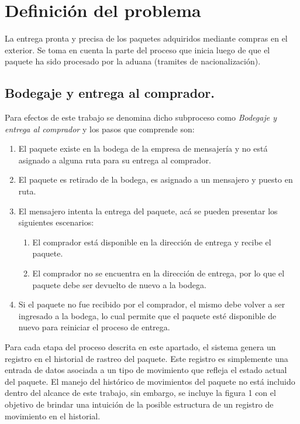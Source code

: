 \documentclass[12pt,a4paper,table]{article}
\begin{document}
\section{Definición del problema}
La entrega pronta y precisa de los paquetes adquiridos mediante compras en el exterior. Se toma en cuenta la parte del proceso que inicia luego de que el paquete ha sido procesado por la aduana (tramites de nacionalización).
\subsection{Bodegaje y entrega al comprador.}
Para efectos de este trabajo se denomina dicho subproceso como \textit{Bodegaje y entrega al comprador} y los pasos que comprende son:
\begin{enumerate}
\item El paquete existe en la bodega de la empresa de mensajería y no está asignado a alguna ruta para su entrega al comprador.
\item El paquete es retirado de la bodega, es asignado a un mensajero y puesto en ruta.
\item El mensajero intenta la entrega del paquete, acá se pueden presentar los siguientes escenarios:
\begin{enumerate}
\item El comprador está disponible en la dirección de entrega y recibe el paquete.
\item El comprador no se encuentra en la dirección de entrega, por lo que el paquete debe ser devuelto de nuevo a la bodega.
\end{enumerate}
\item Si el paquete no fue recibido por el comprador, el mismo debe volver a ser ingresado a la bodega, lo cual permite que el paquete esté disponible de nuevo para reiniciar el proceso de entrega.
\end{enumerate}

Para cada etapa del proceso descrita en este apartado, el sistema genera un registro en el historial de rastreo del paquete. Este registro es simplemente una entrada de datos asociada a un tipo de movimiento que refleja el estado actual del paquete. El manejo del histórico de movimientos del paquete no está incluido dentro del alcance de este trabajo, sin embargo, se incluye la figura 1 con el objetivo de brindar una intuición de la posible estructura de un registro de movimiento en el historial. 

\end{document}
